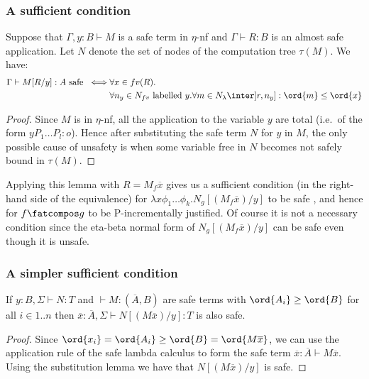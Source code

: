 \subsubsection{A sufficient condition}
\begin{lemma}
Suppose that $\Gamma,y:B \vdash M$ is a safe term in $\eta$-nf and $\Gamma \vdash R : B$ is an almost safe application. Let $N$ denote the set of nodes of the computation tree $\tau(M)$. We have:
\begin{align*}
\Gamma \vdash M[R/y] :A \mbox{ safe }
\iff&  \forall x \in fv(R) . \\
    & \forall n_y \in N_{fv} \mbox{ labelled $y$}.
      \forall m \in N_{\lambda} \inter ]r,n_y] : \ord{m} \leq \ord{x}
\end{align*}
\end{lemma}
\begin{proof}
Since $M$ is in $\eta$-nf, all the application to the variable $y$ are total (i.e.~of the form $y P_1 \ldots P_l :o$). Hence after substituting the safe term $N$ for $y$ in $M$, the only possible cause of unsafety is when
some variable free in $N$ becomes not safely bound in $\tau(M)$.
\end{proof}

Applying this lemma with $R= M_f \overline{x}$ gives us a sufficient condition (in the right-hand side of the equivalence)
for $\lambda x \phi_1 \dots \phi_k. N_g [(M_f \overline{x}) / y]$ to be safe , and hence for $f\fatcompos g$ to be P-incrementally justified. Of course it is not a necessary condition since the
eta-beta normal form of  $N_g[(M_f \overline{x}) /y]$ can be safe even though it is unsafe.

\subsubsection{A simpler sufficient condition}
\begin{lemma}
If $y:B, \Sigma \vdash N : T$ and $\vdash M : (\overline{A}, B)$
are safe terms with $\ord{A_i} \geq \ord{B}$ for all $i\in 1..n$
then $\overline{x}:\overline{A}, \Sigma \vdash N[(M \overline{x})/y] :T$ is also safe.
\end{lemma}
\begin{proof}
Since $\ord{x_i} = \ord{A_i} \geq \ord{B} = \ord{M \overline{x}}$, we can use the application
rule of the safe lambda calculus to form the safe term $\overline{x}:\overline{A} \vdash M \overline{x}$.
Using the substitution lemma we have that $N[(M \overline{x})/y]$ is safe.
\end{proof}

